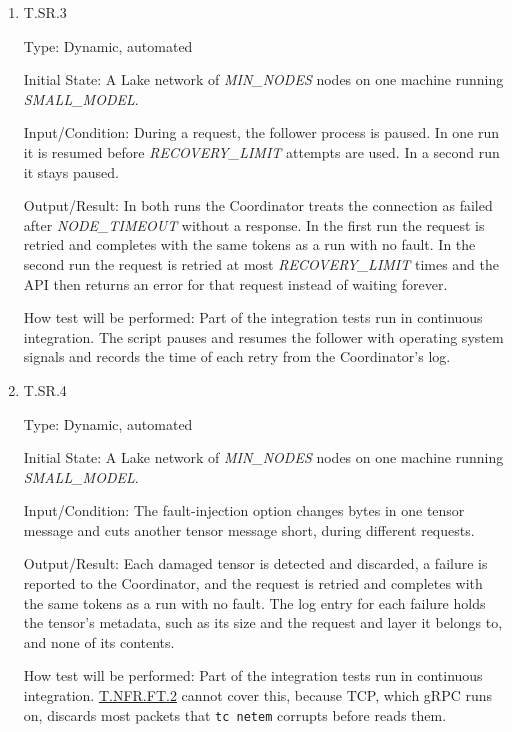\documentclass[12pt, titlepage]{article}
\begin{document}
\begin{enumerate}
How test will be performed: Part of the integration tests run in continuous
integration. The fault-injection option holds back health reports and fails health
checks. The Coordinator's routing log records which node each request is sent
to.

\item{T.SR.3\\}
\label{T.SR.3}

Type: Dynamic, automated

Initial State: A Lake network of \textit{MIN\_NODES} nodes on one machine running
\textit{SMALL\_MODEL}.

Input/Condition: During a request, the follower process is paused. In one run
it is resumed before \textit{RECOVERY\_LIMIT} attempts are used. In a second
run it stays paused.

Output/Result: In both runs the Coordinator treats the connection as failed
after \textit{NODE\_TIMEOUT} without a response. In the first run the request
is retried and completes with the same tokens as a run with no fault. In the
second run the request is retried at most \textit{RECOVERY\_LIMIT} times and
the API then returns an error for that request instead of waiting forever.

How test will be performed: Part of the integration tests run in continuous
integration. The script pauses and resumes the follower with operating system
signals and records the time of each retry from the Coordinator's log.

\item{T.SR.4\\}
\label{T.SR.4}

Type: Dynamic, automated

Initial State: A Lake network of \textit{MIN\_NODES} nodes on one machine running
\textit{SMALL\_MODEL}.

Input/Condition: The fault-injection option changes bytes in one tensor
message and cuts another tensor message short, during different requests.

Output/Result: Each damaged tensor is detected and discarded, a failure is
reported to the Coordinator, and the request is retried and completes with the
same tokens as a run with no fault. The log entry for each failure holds the
tensor's metadata, such as its size and the request and layer it belongs to,
and none of its contents.

How test will be performed: Part of the integration tests run in continuous
integration. \hyperref[T.NFR.FT.2]{T.NFR.FT.2} cannot cover this, because TCP,
which gRPC runs on, discards most packets that \texttt{tc netem} corrupts
before \progname{} reads them.


\end{enumerate}
\end{document}

